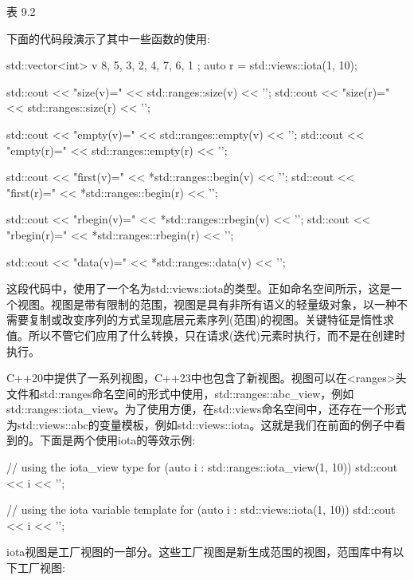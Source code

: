 \begin{center}
表 9.2
\end{center}

下面的代码段演示了其中一些函数的使用:

\begin{cpp}
std::vector<int> v{ 8, 5, 3, 2, 4, 7, 6, 1 };
auto r = std::views::iota(1, 10);

std::cout << "size(v)=" << std::ranges::size(v) << '\n';
std::cout << "size(r)=" << std::ranges::size(r) << '\n';

std::cout << "empty(v)=" << std::ranges::empty(v) << '\n';
std::cout << "empty(r)=" << std::ranges::empty(r) << '\n';

std::cout << "first(v)=" << *std::ranges::begin(v) << '\n';
std::cout << "first(r)=" << *std::ranges::begin(r) << '\n';

std::cout << "rbegin(v)=" << *std::ranges::rbegin(v)
		  << '\n';
std::cout << "rbegin(r)=" << *std::ranges::rbegin(r)
		  << '\n';
		  
std::cout << "data(v)=" << *std::ranges::data(v) << '\n';
\end{cpp}

这段代码中，使用了一个名为std::views::iota的类型。正如命名空间所示，这是一个视图。视图是带有限制的范围，视图是具有非所有语义的轻量级对象，以一种不需要复制或改变序列的方式呈现底层元素序列(范围)的视图。关键特征是惰性求值。所以不管它们应用了什么转换，只在请求(迭代)元素时执行，而不是在创建时执行。

C++20中提供了一系列视图，C++23中也包含了新视图。视图可以在<ranges>头文件和std::ranges命名空间的形式中使用，std::ranges::abc\_view，例如std::ranges::iota\_view。为了使用方便，在std::views命名空间中，还存在一个形式为std::views::abc的变量模板，例如std::views::iota。这就是我们在前面的例子中看到的。下面是两个使用iota的等效示例:

\begin{cpp}
// using the iota_view type
for (auto i : std::ranges::iota_view(1, 10))
	std::cout << i << '\n';

// using the iota variable template
for (auto i : std::views::iota(1, 10))
	std::cout << i << '\n';
\end{cpp}

iota视图是工厂视图的一部分。这些工厂视图是新生成范围的视图，范围库中有以下工厂视图:

